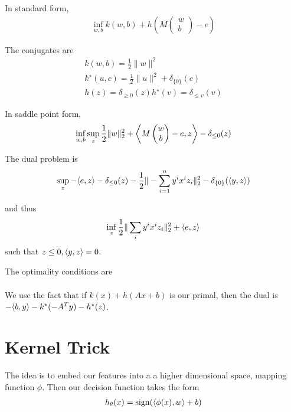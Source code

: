 \begin{defn}
  \label{defn:support_vector_machines:2}
  In standard form,
  \begin{align}
    \label{eq:97}
    \inf_{w, b} k(w, b) + h(M
    \begin{pmatrix}
      w \\
      b
    \end{pmatrix}
    - e)
  \end{align}

  The conjugates are
  \begin{align}
    \label{eq:98}
    k(w, b) = \frac{1}{2} \| w \|^{2} \\
    k^{\star}(u, c) = \frac{1}{2} \| u \|^{2} + \delta_{\{ 0 \}}(c) \\
    h(z) = \delta_{\geq 0}(z)
    h^{\star}(v) = \delta_{\leq v}(v)
  \end{align}

  In saddle point form,
  \begin{align}
    \label{eq:99}
    \inf_{w, b} \sup_{z} \frac{1}{2} \| w \|_{2}^{2} + \IP{M
      \begin{pmatrix}
        w \\
        b
      \end{pmatrix} - e, z} - \delta_{\leq 0}(z)
  \end{align}

  The dual problem is
  \begin{align}
    \label{eq:100}
    \sup_{z} - \IP{e, z} - \delta_{\leq 0}(z) - \frac{1}{2} \| -
    \sum_{i=1}^{n} y^{i} x^{i} z_{i} \|_{2}^{2} - \delta_{\{ 0
      \}}(\IP{y, z})
  \end{align}

  and thus
  \begin{align}
    \label{eq:101}
    \inf_{z} \frac{1}{2} \| \sum_{i} y^{i} x^{i} z_{i} \|_{2}^{2} +
    \IP{e, z}
  \end{align} such that $z \leq 0, \IP{y, z} = 0$.

  The optimality conditions are
  \begin{align}
    \label{eq:102}
  \end{align}

  We use the fact that if $k(x) + h(Ax + b)$ is our primal,
  then the dual is $-\IP{b, y} - k^{\star}(-A^{T}y) - h^{\star}(z)$.
\end{defn}


\section{Kernel Trick}
\label{sec:kernel-trick}

The idea is to embed our features into a a higher dimensional space,
mapping function $\phi$.  Then our decision function takes the form
\begin{align}
  \label{eq:103}
  h_{\theta}(x) = \sign(\IP{\phi(x), w} + b)
\end{align}


